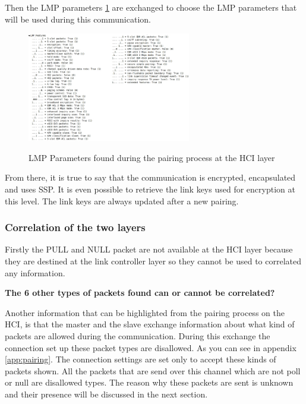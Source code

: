 Then the LMP parameters \ref{fig:lmp} are exchanged to choose the LMP parameters that will be used during this communication. 
\begin{figure}[!h]
  \begin{center}
	\includegraphics[width=270px]{images/LMP_PARAM.jpg}
	\label{fig:lmp}
	\caption{LMP Parameters found during the pairing process at the HCI layer}
  \end{center}
\end{figure}

From there, it is true to say that the communication is encrypted, encapsulated and uses SSP. It is even possible to retrieve the link keys used for encryption at this level. The link keys are always updated after a new pairing.

\subsubsection{Correlation of the two layers}

Firstly the PULL and NULL packet are not available at the HCI layer because they are destined at the link controller layer so they cannot be used to correlated any information. 


\textbf{The 6 other types of packets found can or cannot be correlated?}

Another information that can be highlighted from the pairing process on the HCI, is that the master and the slave exchange information about what kind of packets are allowed during the communication. During this exchange the connection set up these packet types are disallowed. As you can see in appendix \ref{app:pairing}. The connection settings are set only to accept these kinds of packets shown. All the packets that are send over this channel which are not poll or null are disallowed types. The reason why these packets are sent is unknown and their presence will be discussed in the next section.  \pend


